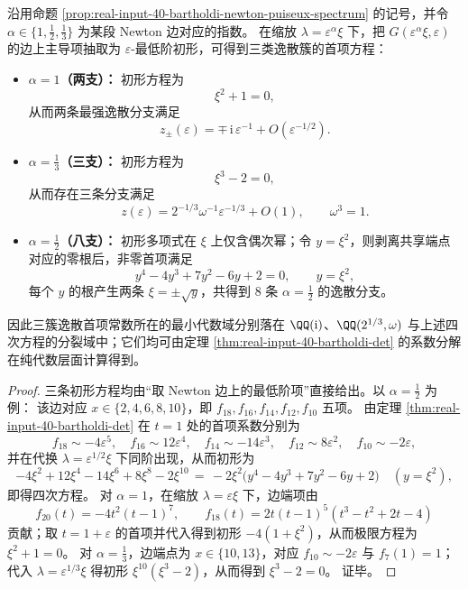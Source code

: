 \begin{proposition}[逸散簇的初形方程与首项代数常数]\label{prop:real-input-40-bartholdi-escape-initial-forms}
沿用命题 \ref{prop:real-input-40-bartholdi-newton-puiseux-spectrum} 的记号，并令 \(\alpha\in\{1,\tfrac12,\tfrac13\}\) 为某段 Newton 边对应的指数。
在缩放 \(\lambda=\varepsilon^{\alpha}\xi\) 下，把 \(G(\varepsilon^{\alpha}\xi,\varepsilon)\) 的边上主导项抽取为 \(\varepsilon\)-最低阶初形，可得到三类逸散簇的首项方程：
\begin{itemize}
  \item \textbf{\(\alpha=1\)（两支）：}
  初形方程为
  \[
  \xi^2+1=0,
  \]
  从而两条最强逸散分支满足
  \[
  z_{\pm}(\varepsilon)=\mp\,\mathrm{i}\,\varepsilon^{-1}+O\!\left(\varepsilon^{-1/2}\right).
  \]
  \item \textbf{\(\alpha=\tfrac13\)（三支）：}
  初形方程为
  \[
  \xi^3-2=0,
  \]
  从而存在三条分支满足
  \[
  z(\varepsilon)=2^{-1/3}\omega^{-1}\varepsilon^{-1/3}+O(1),\qquad \omega^3=1.
  \]
  \item \textbf{\(\alpha=\tfrac12\)（八支）：}
  初形多项式在 \(\xi\) 上仅含偶次幂；令 \(y=\xi^2\)，则剥离共享端点对应的零根后，非零首项满足
  \[
  y^4-4y^3+7y^2-6y+2=0,\qquad y=\xi^2,
  \]
  每个 \(y\) 的根产生两条 \(\xi=\pm\sqrt{y}\)，共得到 \(8\) 条 \(\alpha=\tfrac12\) 的逸散分支。
\end{itemize}
因此三簇逸散首项常数所在的最小代数域分别落在 \(\QQ(\mathrm{i})\)、\(\QQ(2^{1/3},\omega)\) 与上述四次方程的分裂域中；它们均可由定理 \ref{thm:real-input-40-bartholdi-det} 的系数分解在纯代数层面计算得到。
\end{proposition}
\begin{proof}
三条初形方程均由“取 Newton 边上的最低阶项”直接给出。以 \(\alpha=\tfrac12\) 为例：
该边对应 \(x\in\{2,4,6,8,10\}\)，即 \(f_{18},f_{16},f_{14},f_{12},f_{10}\) 五项。
由定理 \ref{thm:real-input-40-bartholdi-det} 在 \(t=1\) 处的首项系数分别为
\[
f_{18}\sim -4\varepsilon^5,\quad
f_{16}\sim 12\varepsilon^4,\quad
f_{14}\sim -14\varepsilon^3,\quad
f_{12}\sim 8\varepsilon^2,\quad
f_{10}\sim -2\varepsilon,
\]
并在代换 \(\lambda=\varepsilon^{1/2}\xi\) 下同阶出现，从而初形为
\[
-4\xi^2+12\xi^4-14\xi^6+8\xi^8-2\xi^{10}
\,=\,
-2\xi^2\bigl(y^4-4y^3+7y^2-6y+2\bigr)\quad(y=\xi^2),
\]
即得四次方程。
对 \(\alpha=1\)，在缩放 \(\lambda=\varepsilon\xi\) 下，边端项由
\[
f_{20}(t)=-4t^2(t-1)^7,
\qquad
f_{18}(t)=2t(t-1)^5(t^3-t^2+2t-4)
\]
贡献；取 \(t=1+\varepsilon\) 的首项并代入得到初形 \(-4(1+\xi^2)\)，从而极限方程为 \(\xi^2+1=0\)。
对 \(\alpha=\tfrac13\)，边端点为 \(x\in\{10,13\}\)，对应 \(f_{10}\sim -2\varepsilon\) 与 \(f_7(1)=1\)；
代入 \(\lambda=\varepsilon^{1/3}\xi\) 得初形 \(\xi^{10}(\xi^3-2)\)，从而得到 \(\xi^3-2=0\)。
证毕。
\end{proof}

